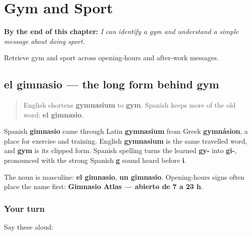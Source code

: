 
\chapter{Gym and Sport}
\label{ch:gimnasio-deporte}

\begin{chapteropening}
\textbf{By the end of this chapter:} \emph{I can identify a gym and understand a simple message about doing sport.}

Retrieve gym and sport across opening-hours and after-work messages.
\end{chapteropening}

\section[el gimnasio]{el gimnasio — the long form behind gym}

\label{lesson:ES-C412-gimnasio}



\begin{quote}
English shortens \textbf{gymnasium} to \textbf{gym}. Spanish keeps more of the old word: \textbf{el gimnasio}.
\end{quote}

\begin{cousinweb}
Spanish \textbf{gimnasio} came through Latin \textbf{gymnasium} from Greek \textbf{gymnásion}, a place for exercise and training. English \textbf{gymnasium} is the same travelled word, and \textbf{gym} is its clipped form. Spanish spelling turns the learned \textbf{gy-} into \textbf{gi-}, pronounced with the strong Spanish \textbf{g} sound heard before \textbf{i}.
\end{cousinweb}

\begin{grammarlens}[title={Grammar Lens: naming the place}]
The noun is masculine: \textbf{el gimnasio}, \textbf{un gimnasio}. Opening-hours signs often place the name first: \textbf{Gimnasio Atlas — abierto de 7 a 23 h}.
\end{grammarlens}

\subsection*{Your turn}
Say these aloud:

